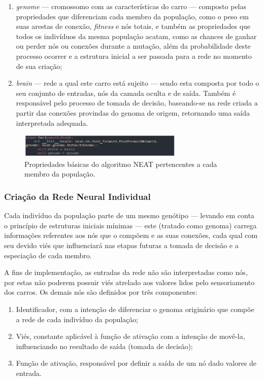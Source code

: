\begin{enumerate}
	\item \textit{genome} — cromossomo com as características do carro — composto pelas propriedades que diferenciam cada membro da população, como o peso em suas arestas de conexão, \textit{fitness} e nós totais, e também as propriedades que todos os indivíduos da mesma população acatam, como as chances de ganhar ou perder nós ou conexões durante a mutação, além da probabilidade deste processo ocorrer e a estrutura inicial a ser passada para a rede no momento de sua criação; 
	\item \textit{brain} —  rede a qual este carro está sujeito — sendo esta composta por todo o seu conjunto de entradas, nós da camada oculta e de saída. Também é responsável pelo processo de tomada de decisão, baseando-se na rede criada a partir das conexões provindas do genoma de origem, retornando uma saída interpretada adequada.
\end{enumerate}

\begin{figure}[htb]
        \centering
        \caption{\label{fig_DA}Propriedades básicas do algoritmo NEAT pertencentes a cada membro da população.}
        \includegraphics[width=0.7\textwidth]{images/DA.png}
\end{figure}

\subsubsection{Criação da Rede Neural Individual}
Cada indivíduo da população parte de um mesmo genótipo — levando em conta o princípio de estruturas iniciais mínimas —
este (tratado como genoma) carrega informações referentes aos nós que o compõem e as suas conexões,
cada qual com seu devido viés que influenciará nas etapas futuras a tomada de decisão e a especiação de cada membro.

A fins de implementação, as entradas da rede não são interpretadas como nós, por estas não poderem possuir
viés atrelado aos valores lidos pelo sensoriamento dos carros. Os demais nós são definidos por três componentes: 

\begin{enumerate}
	\item Identificador, com a intenção de diferenciar o genoma originário que compõe a rede de cada indivíduo da população;
	\item Viés, constante aplicável à função de ativação com a intenção de movê-la, influenciando no resultado de saída (tomada de decisão);
	\item Função de ativação, responsável por definir a saída de um nó dado valores de entrada.
\end{enumerate}

